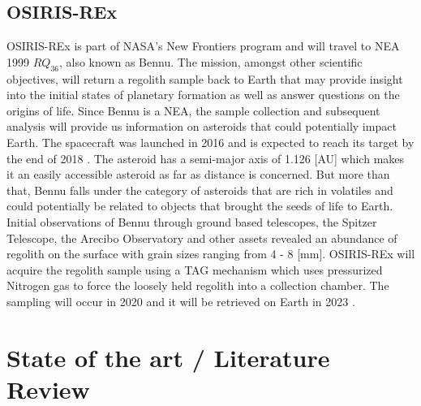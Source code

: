 \subsection{OSIRIS-REx}
\label{subsec:osiris_heritage}
\gls{OSIRIS-REx} is part of \gls{NASA}'s New Frontiers program and will travel to \gls{NEA} 1999 $RQ_{36}$, also known as Bennu. The mission, amongst other scientific objectives, will return a regolith sample back to Earth that may provide insight into the initial states of planetary formation as well as answer questions on the origins of life. Since Bennu is a \gls{NEA}, the sample collection and subsequent analysis will provide us information on asteroids that could potentially impact Earth. The spacecraft was launched in 2016 and is expected to reach its target by the end of 2018 \parencite{berry2013osiris}. The asteroid has a semi-major axis of 1.126 [AU] which makes it an easily accessible asteroid as far as distance is concerned. But more than that, Bennu falls under the category of asteroids that are rich in volatiles and could potentially be related to objects that brought the seeds of life to Earth. Initial observations of Bennu through ground based telescopes, the Spitzer Telescope, the Arecibo Observatory and other assets revealed an abundance of regolith on the surface with grain sizes ranging from 4 - 8 [mm]. \gls{OSIRIS-REx} will acquire the regolith sample using a \gls{TAG} mechanism which uses pressurized Nitrogen gas to force the loosely held regolith into a collection chamber. The sampling will occur in 2020 and it will be retrieved on Earth in 2023 \parencite{osirisMissionOverview}.

\section{State of the art / Literature Review}
\label{sec:literature_review}
